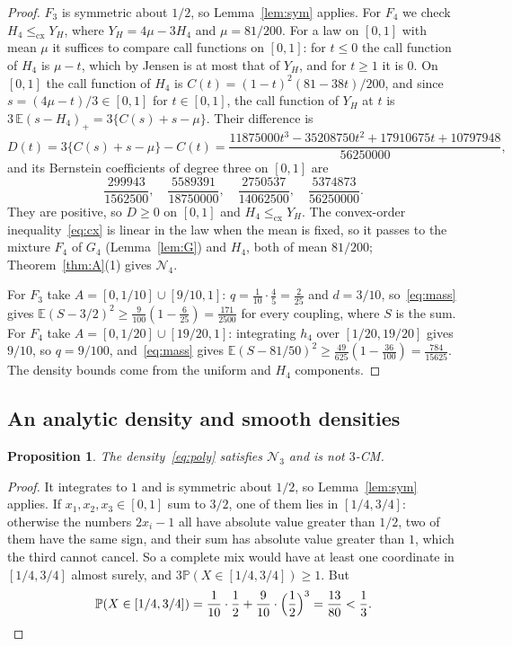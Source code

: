 \documentclass[11pt]{amsart}
\newtheorem{proposition}[theorem]{Proposition}
\theoremstyle{definition}
\newcommand{\Prob}{\mathbb{P}}
\newcommand{\E}{\mathbb{E}}
\newcommand{\cx}{\le_{\mathrm{cx}}}
\newcommand{\cN}{\mathcal{N}}
\begin{document}
\begin{proof}
$F_3$ is symmetric about $1/2$, so Lemma~\ref{lem:sym} applies. For $F_4$ we check $H_4\cx Y_H$, where
$Y_H=4\mu-3H_4$ and $\mu=81/200$. For a law on $[0,1]$ with mean $\mu$ it suffices to compare call functions on
$[0,1]$: for $t\le0$ the call function of $H_4$ is $\mu-t$, which by Jensen is at most that of $Y_H$, and for $t\ge1$ it
is $0$. On $[0,1]$ the call function of $H_4$ is $C(t)=(1-t)^2(81-38t)/200$, and since $s=(4\mu-t)/3\in[0,1]$ for
$t\in[0,1]$, the call function of $Y_H$ at $t$ is $3\,\E(s-H_4)_+=3\{C(s)+s-\mu\}$. Their difference is
\[
D(t)=3\{C(s)+s-\mu\}-C(t)=\frac{11875000t^3-35208750t^2+17910675t+10797948}{56250000},
\]
and its Bernstein coefficients of degree three on $[0,1]$ are
\[
\frac{299943}{1562500},\quad\frac{5589391}{18750000},\quad\frac{2750537}{14062500},\quad\frac{5374873}{56250000}.
\]
They are positive, so $D\ge0$ on $[0,1]$ and $H_4\cx Y_H$. The convex-order inequality~\eqref{eq:cx} is linear in the
law when the mean is fixed, so it passes to the mixture $F_4$ of $G_4$ (Lemma~\ref{lem:G}) and $H_4$, both of mean
$81/200$; Theorem~\ref{thm:A}(1) gives $\cN_4$.

For $F_3$ take $A=[0,1/10]\cup[9/10,1]$: $q=\frac1{10}\cdot\frac45=\frac2{25}$ and $d=3/10$, so~\eqref{eq:mass} gives
$\E(S-3/2)^2\ge\frac9{100}(1-\frac6{25})=\frac{171}{2500}$ for every coupling, where $S$ is the sum. For $F_4$ take
$A=[0,1/20]\cup[19/20,1]$: integrating $h_4$ over $[1/20,19/20]$ gives $9/10$, so $q=9/100$, and~\eqref{eq:mass} gives
$\E(S-81/50)^2\ge\frac{49}{625}(1-\frac{36}{100})=\frac{784}{15625}$. The density bounds come from the uniform and
$H_4$ components.
\end{proof}

\subsection{An analytic density and smooth densities}

\begin{proposition}\label{prop:poly}
The density~\eqref{eq:poly} satisfies $\cN_3$ and is not $3$-CM.
\end{proposition}

\begin{proof}
It integrates to $1$ and is symmetric about $1/2$, so Lemma~\ref{lem:sym} applies. If $x_1,x_2,x_3\in[0,1]$ sum to
$3/2$, one of them lies in $[1/4,3/4]$: otherwise the numbers $2x_i-1$ all have absolute value greater than $1/2$, two
of them have the same sign, and their sum has absolute value greater than $1$, which the third cannot cancel. So a
complete mix would have at least one coordinate in $[1/4,3/4]$ almost surely, and $3\Prob(X\in[1/4,3/4])\ge1$. But
\[
\Prob(X\in[1/4,3/4])=\frac1{10}\cdot\frac12+\frac9{10}\cdot\Big(\frac12\Big)^3=\frac{13}{80}<\frac13.\qedhere
\]
\end{proof}
\end{document}
